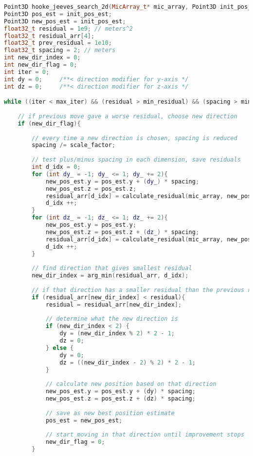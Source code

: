 \documentclass[12pt,a4paper]{report}
\begin{document}
\begin{lstlisting}[language=C++]
Point3D hooke_jeeves_search_2d(MicArray_t* mic_array, Point3D init_pos_est, float32_t measured_time_shifts[], int max_iter, float32_t min_residual, float32_t min_spacing, float32_t scale_factor) {
Point3D pos_est = init_pos_est;
Point3D new_pos_est = init_pos_est;
float32_t residual = 1e9; // meters^2
float32_t residual_arr[4];
float32_t prev_residual = 1e10;
float32_t spacing = 2; // meters
int new_dir_index = 0;
int new_dir_flag = 0;
int iter = 0;
int dy = 0;     /**< direction modifier for y-axis */
int dz = 0;     /**< direction modifier for z-axis */

while ((iter < max_iter) && (residual > min_residual) && (spacing > min_spacing)){
	
	// if previous move gave a worse residual, choose new direction
	if (new_dir_flag){
		
		// every time a new direction is chosen, spacing is reduced
		spacing /= scale_factor;
		
		// test plus/minus spacing in each dimension, save residuals
		int d_idx = 0;
		for (int dy_ = -1; dy_ <= 1; dy_ += 2){
			new_pos_est.y = pos_est.y + (dy_) * spacing;
			new_pos_est.z = pos_est.z;
			residual_arr[d_idx] = calculate_residual(mic_array, new_pos_est, measured_time_shifts);
			d_idx ++;
		}
		for (int dz_ = -1; dz_ <= 1; dz_ += 2){
			new_pos_est.y = pos_est.y;
			new_pos_est.z = pos_est.z + (dz_) * spacing;
			residual_arr[d_idx] = calculate_residual(mic_array, new_pos_est, measured_time_shifts);
			d_idx ++;
		}
		
		// find direction that gives smallest residual
		new_dir_index = arg_min(residual_arr, d_idx);
		
		// if that direction has a smaller residual than the previous residual, move in that direction
		if (residual_arr[new_dir_index] < residual){
			residual = residual_arr[new_dir_index];
			
			// determine what the new direction is
			if (new_dir_index < 2) {
				dy = (new_dir_index % 2) * 2 - 1;
				dz = 0;
			} else {
				dy = 0;
				dz = ((new_dir_index - 2) % 2) * 2 - 1;
			}
			
			// calculate new position based on that direction
			new_pos_est.y = pos_est.y + (dy) * spacing;
			new_pos_est.z = pos_est.z + (dz) * spacing;
			
			// save as new best position estimate
			pos_est = new_pos_est;
			
			// start moving in that direction until improvement stops
			new_dir_flag = 0;
		}
		

\end{lstlisting}
\end{document}
